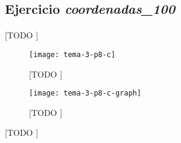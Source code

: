 \documentclass[spanish]{article}
\begin{document}
		\subsection{Ejercicio \emph{coordenadas\_100}}
		\label{sec:e-8c}

			\paragraph{}
			[TODO ]

			\begin{figure}[h]
				\begin{center}
					\texttt{[image: tema-3-p8-c]}
				\end{center}
				\caption{[TODO ]}
				\label{}
			\end{figure}

			\begin{figure}[h]
				\begin{center}
					\texttt{[image: tema-3-p8-c-graph]}
				\end{center}
				\caption{[TODO ]}
				\label{}
			\end{figure}

			\begin{table}[h]
				\begin{center}
				\end{center}
				\caption{[TODO ]}
				\label{}
			\end{table}

	\nocite{subject:mio}
	\nocite{garciparedes:mosel-examples}
	
  
\end{document}
